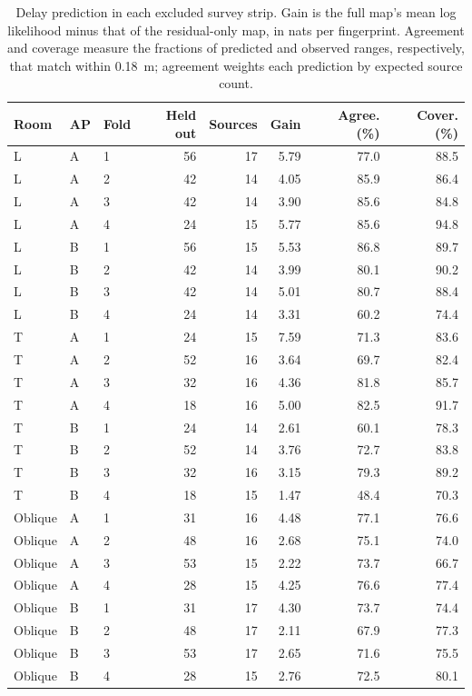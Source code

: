 \begin{table}[H]
\centering
\small
\caption{Delay prediction in each excluded survey strip. Gain is the full map's mean log likelihood minus that of the residual-only map, in nats per fingerprint. Agreement and coverage measure the fractions of predicted and observed ranges, respectively, that match within 0.18~m; agreement weights each prediction by expected source count.}
\label{tab:suppsurfaces}
\setlength{\tabcolsep}{4pt}
\begin{tabular}{lllrrrrr}
\toprule
Room & AP & Fold & Held out & Sources & Gain & Agree. (\%) & Cover. (\%)\\
\midrule
L & A & 1 & 56 & 17 & 5.79 & 77.0 & 88.5\\
L & A & 2 & 42 & 14 & 4.05 & 85.9 & 86.4\\
L & A & 3 & 42 & 14 & 3.90 & 85.6 & 84.8\\
L & A & 4 & 24 & 15 & 5.77 & 85.6 & 94.8\\
L & B & 1 & 56 & 15 & 5.53 & 86.8 & 89.7\\
L & B & 2 & 42 & 14 & 3.99 & 80.1 & 90.2\\
L & B & 3 & 42 & 14 & 5.01 & 80.7 & 88.4\\
L & B & 4 & 24 & 14 & 3.31 & 60.2 & 74.4\\
T & A & 1 & 24 & 15 & 7.59 & 71.3 & 83.6\\
T & A & 2 & 52 & 16 & 3.64 & 69.7 & 82.4\\
T & A & 3 & 32 & 16 & 4.36 & 81.8 & 85.7\\
T & A & 4 & 18 & 16 & 5.00 & 82.5 & 91.7\\
T & B & 1 & 24 & 14 & 2.61 & 60.1 & 78.3\\
T & B & 2 & 52 & 14 & 3.76 & 72.7 & 83.8\\
T & B & 3 & 32 & 16 & 3.15 & 79.3 & 89.2\\
T & B & 4 & 18 & 15 & 1.47 & 48.4 & 70.3\\
Oblique & A & 1 & 31 & 16 & 4.48 & 77.1 & 76.6\\
Oblique & A & 2 & 48 & 16 & 2.68 & 75.1 & 74.0\\
Oblique & A & 3 & 53 & 15 & 2.22 & 73.7 & 66.7\\
Oblique & A & 4 & 28 & 15 & 4.25 & 76.6 & 77.4\\
Oblique & B & 1 & 31 & 17 & 4.30 & 73.7 & 74.4\\
Oblique & B & 2 & 48 & 17 & 2.11 & 67.9 & 77.3\\
Oblique & B & 3 & 53 & 17 & 2.65 & 71.6 & 75.5\\
Oblique & B & 4 & 28 & 15 & 2.76 & 72.5 & 80.1\\
\bottomrule
\end{tabular}
\end{table}
